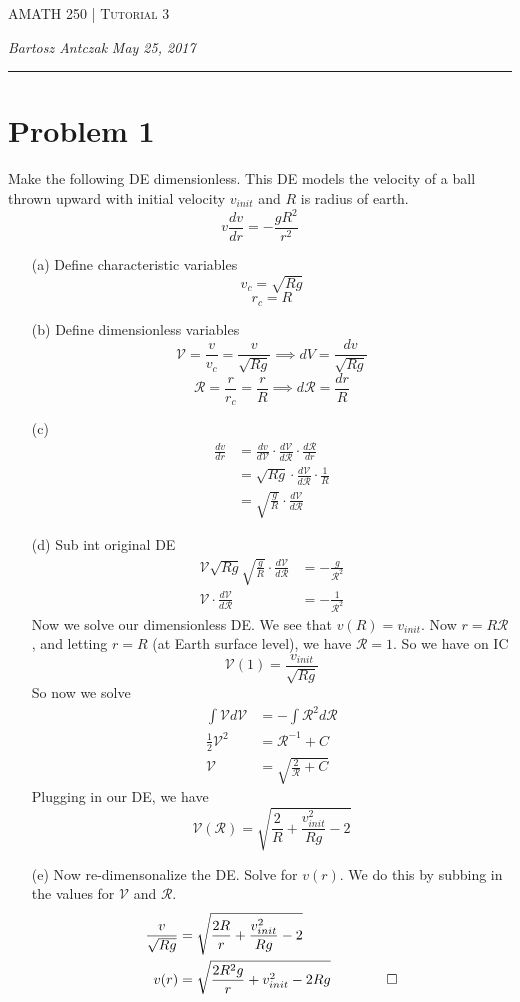 \documentclass{report}
\newcommand{\lectureNum}{3}
\newcommand{\curDate}{May 25, 2017}
\newcommand{\course}{AMATH 250}
\begin{document}
\begin{center}
\begin{Large}
\textsc{\course{} | Tutorial \lectureNum{}}
\end{Large}
\end{center} 
\noindent \textit{Bartosz Antczak} \hfill
\textit{\curDate{}}
\rule{\textwidth}{0.4pt}
\section*{Problem 1}
Make the following DE dimensionless. This DE models the velocity of a ball thrown upward with initial velocity $v_{init}$ and $R$ is radius of earth.
\begin{equation}
v\frac{dv}{dr} = -\frac{gR^2}{r^2}
\end{equation}
\begin{enumerate}
\item[(a)] Define characteristic variables
$$v_c = \sqrt{Rg}$$
$$r_c = R$$
\item[(b)] Define dimensionless variables
$$\mathcal{V} = \frac{v}{v_c} = \frac{v}{\sqrt{Rg}} \implies dV = \frac{dv}{\sqrt{Rg}}$$
$$\mathcal{R} = \frac{r}{r_c} = \frac{r}{R} \implies d\mathcal{R} = \frac{dr}{R}$$
\item[(c)]
\begin{align}
\frac{dv}{dr}&=\frac{dv}{d\mathcal{V}}\cdot\frac{d\mathcal{{V}}}{d\mathcal{R}}\cdot\frac{d\mathcal{R}}{dr} \\
&= \sqrt{Rg}\cdot\frac{d\mathcal{V}}{d\mathcal{R}}\cdot\frac{1}{R} \\
&= \sqrt{\frac{g}{R}}\cdot \frac{d\mathcal{V}}{d\mathcal{R}}
\end{align}
\item[(d)] Sub int original DE
\begin{align}
\mathcal{V}\sqrt{Rg}\sqrt{\frac{g}{R}} \cdot\frac{d\mathcal{V}}{d\mathcal{R}} &= -\frac{g}{\mathcal{R}^2} \\
\mathcal{V}\cdot \frac{d\mathcal{V}}{d\mathcal{R}} &= -\frac{1}{\mathcal{R}^2}
\end{align}
Now we solve our dimensionless DE. We see that $v(R) = v_{init}$. Now $r = R\mathcal{R}$, and letting $r = R$ (at Earth surface level), we have $\mathcal{R} = 1$. So we have on IC
$$\mathcal{V}(1) = \frac{v_{init}}{\sqrt{Rg}}$$
So now we solve
\begin{align}
\int \mathcal{V} d\mathcal{V} &= - \int \mathcal{R}^2 d\mathcal{R} \\
\frac{1}{2}\mathcal{V}^2 &= \mathcal{R}^{-1} + C \\
\mathcal{V} &= \sqrt{\frac{2}{\mathcal{R}}+C}
\end{align}
Plugging in our DE, we have
$$\mathcal{V}(\mathcal{R}) = \sqrt{\frac{2}{R} + \frac{v_{init}^2}{Rg} - 2}$$
\item[(e)] Now re-dimensonalize the DE. Solve for $v(r)$. We do this by subbing in the values for $\mathcal{V}$ and $\mathcal{R}$.
\begin{align}
\frac{v}{\sqrt{Rg}} &= \sqrt{\frac{2R}{r} + \frac{v_{init}^2}{Rg} - 2} \\
v(r) &= \sqrt{\frac{2R^2g}{r} + v_{init}^2 - 2Rg} \qquad \qed
\end{align}
\end{enumerate}
\end{document}
